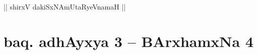 \begin{center}
|| shirxV dakiSxNAmUtaRyeVnamaH ||
\end{center}

\section*{baq. adhAyxya 3 -- BArxhamxNa 4}

\vishaya{}

\begin{artha}

\end{artha}
